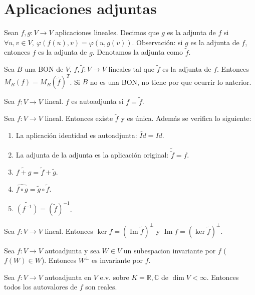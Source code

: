 \documentclass[14pt]{book}
\DeclareMathOperator{\Ima}{Im}
\begin{document}
\section{Aplicaciones adjuntas}
\begin{dfn}
	Sean $f, g: V \to V$ aplicaciones lineales. Decimos que $g$ es la adjunta de $f$ si $\forall u, v \in V,\ \varphi(f(u), v) = \varphi(u, g(v))$. Observación: si $g$ es la adjunta de $f$, entonces $f$ es la adjunta de $g$. Denotamos la adjunta como $\tilde{f}$.
\end{dfn}
\begin{tm}
	Sea $B$ una BON de $V$, $f,\tilde{f}:V \to V$ lineales tal que $\tilde{f}$ es la adjunta de $f$. Entonces $M_B(f) = M_B(\tilde{f})^T$. Si $B$ no es una BON, no tiene por que ocurrir lo anterior.
\end{tm}
\begin{dfn}
	Sea $f:V \to V$ lineal. $f$ es autoadjunta si $f = \tilde{f}$.
\end{dfn}
\begin{pro}
	Sea $f:V \to V$ lineal. Entonces existe $\tilde{f}$ y es única. Además se verifica lo siguiente:
\end{pro}
\begin{enumerate}
	\item La aplicación identidad es autoadjunta: $\tilde{Id} = Id$.
	\item La adjunta de la adjunta es la aplicación original: $\tilde{\tilde{f}} = f$.
	\item $\widetilde{f + g} = \tilde{f} + \tilde{g}$.
	\item $\widehat{f \circ g} = \tilde{g} \circ \tilde{f}$.
	\item $\widetilde{(f^{-1})} = (\tilde{f})^{-1}$.
\end{enumerate}

\begin{pro}
	Sea $f: V \to V$ lineal. Entonces $\ker f = (\Ima\tilde{f})^\perp$ y $\Ima f = (\ker \tilde{f})^\perp$.
\end{pro}

\begin{pro}
	Sea $f:V \to V$ autoadjunta y sea $W \in V$ un subespacion invariante por $f$ ($f(W) \in W$). Entonces $W^\perp$ es invariante por $f$.
\end{pro}

\begin{pro}
	Sea $f: V \to V$ autoadjunta en $V$ e.v. sobre $K = \mathbb{R, C}$ de $\dim V < \infty$. Entonces todos los autovalores de $f$ son reales.
\end{pro}
\end{document}
